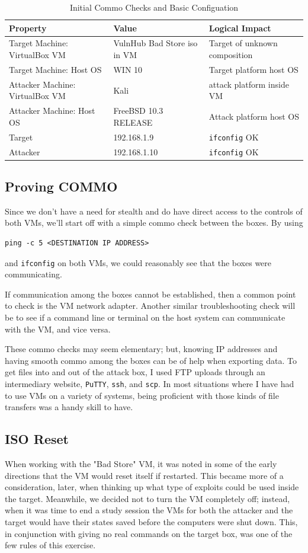 \begin{table}[H]
\caption{Initial Commo Checks and Basic Configuation}
\centering
\begin{tabular}{|l|l|l|}
\hline
Property & Value & Logical Impact \\
\hline
Target Machine:  VirtualBox VM & VulnHub Bad Store iso in VM & Target of unknown composition \\
Target Machine:  Host OS & WIN 10 & Target platform host OS \\
Attacker Machine:  VirtualBox VM & Kali & \gls{attack} platform inside VM \\
Attacker Machine:  Host OS & FreeBSD 10.3 RELEASE & Attack\index{attack} platform host OS \\
Target & 192.168.1.9 & \texttt{ifconfig} OK \\
Attacker & 192.168.1.10 & \texttt{ifconfig} OK \\
\hline
\end{tabular}
\end{table}


\subsection{Proving COMMO}
Since we don't have a need for stealth and do have direct access to the controls of both VMs, we'll start off with a simple commo check between the boxes.  By using 
\begin{lstlisting}
ping -c 5 <DESTINATION IP ADDRESS>
\end{lstlisting}
and \texttt{ifconfig} on both VMs, we could reasonably see that the boxes were communicating.  

If communication among the boxes cannot be established, then a common point to check is the VM network adapter.  Another similar troubleshooting check will be to see if a command line or terminal on the host system can communicate with the VM, and vice versa.  

These commo checks may seem elementary; but, knowing IP addresses and having smooth commo among the boxes can be of help when exporting data. To get files into and out of the attack box, I used FTP uploads through an intermediary website, \texttt{PuTTY}, \texttt{ssh}, and \texttt{scp}.  In most situations where I have had to use VMs on a variety of systems, being proficient with those kinds of file transfers was a handy skill to have.

\subsection{ISO Reset}
When working with the "Bad Store" VM, it was noted in some of the early directions that the VM would reset itself if restarted.  This became more of a consideration, later, when thinking up what type of exploits could be used inside the target.  Meanwhile, we decided not to turn the VM completely off; instead, when it was time to end a study session the VMs for both the attacker and the target would have their states saved before the computers were shut down.  This, in conjunction with giving no real commands on the target box, was one of the few rules of this exercise.

